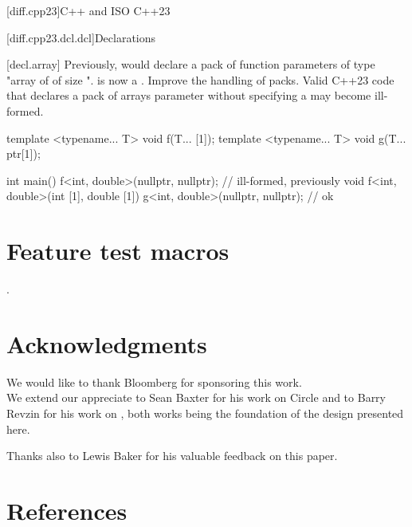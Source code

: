\documentclass{wg21}
\begin{document}
\begin{addedblock}

[diff.cpp23]{C++ and ISO C++23}

[diff.cpp23.dcl.dcl]{Declarations}

[decl.array]
\change
Previously,  would declare a pack of function parameters of type "array of  of size ".
 is now a .
\rationale
Improve the handling of packs.
\effect
Valid C++23 code that declares a
pack of arrays parameter without specifying a  may become ill-formed.

\begin{codeblock}
template <typename... T>
void f(T... [1]);
template <typename... T>
void g(T... ptr[1]);

int main() {
    f<int, double>(nullptr, nullptr); // ill-formed, previously void f<int, double>(int [1], double [1])
    g<int, double>(nullptr, nullptr); // ok
}
\end{codeblock}

\begin{colorblock}

\end{colorblock}

\end{addedblock}

\section{Feature test macros}

.


\section{Acknowledgments}

We would like to thank Bloomberg for sponsoring this work.\\

We extend our appreciate to Sean Baxter for his work on Circle and to Barry Revzin  for his work on , both works being the foundation of the design presented here.

Thanks also to Lewis Baker for his valuable feedback on this paper.

\section{References} %
\end{document}
